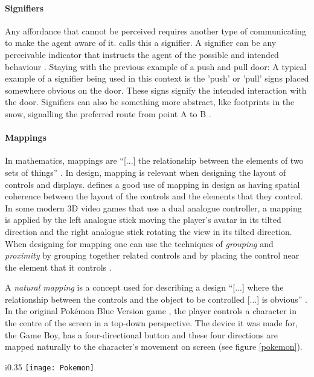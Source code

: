 \paragraph{Signifiers} Any affordance that cannot be perceived requires another type of communicating to make the agent aware of it.  calls this a signifier. A signifier can be any perceivable indicator that instructs the agent of the possible and intended behaviour \cite{norman}. Staying with the previous example of a push and pull door: A typical example of a signifier being used in this context is the 'push' or 'pull' signs placed somewhere obvious on the door. These signs signify the intended interaction with the door. Signifiers can also be something more abstract, like footprints in the snow, signalling the preferred route from point A to B \cite{norman}.

\paragraph{Mappings} In mathematics, mappings are ``[...] the relationship between the elements of two sets of things'' \cite[p. 20]{norman}. In design, mapping is relevant when designing the layout of controls and displays.  defines a good use of mapping in design as having spatial coherence between the layout of the controls and the elements that they control. In some modern 3D video games that use a dual analogue controller, a mapping is applied by the left analogue stick moving the player's avatar in its tilted direction and the right analogue stick rotating the view in its tilted direction. When designing for mapping one can use the techniques of \textit{grouping} and \textit{proximity} by grouping together related controls and by placing the control near the element that it controls \cite{norman}.

A \textit{natural mapping} \cite{norman} is a concept used for describing a design ``[...] where the relationship between the controls and the object to be controlled [...] is obvious'' \cite[p. 115]{norman}. In the original Pokémon Blue Version game \cite{pokemon}, the player controls a character in the centre of the screen in a top-down perspective. The device it was made for, the Game Boy, has a four-directional button and these four directions are mapped naturally to the character's movement on screen (see figure \ref{pokemon}).

\begin{wrapfigure}{i}{0.35\textwidth}
  \texttt{[image: Pokemon]}
  \caption{Pokémon Blue Version playing on a Game Boy}
  \label{pokemon}
\end{wrapfigure}


